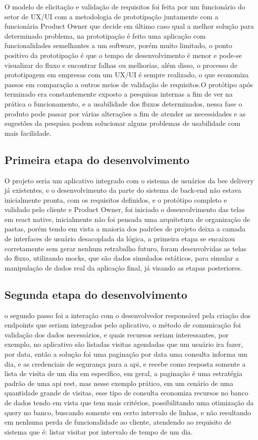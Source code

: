 \documentclass{ufersa}
\begin{document}
O modelo de elicitação e validação de requisitos foi feita por um funcionário do setor de UX/UI com a metodologia de prototipação juntamente com a funcionária Product Owner que decide em último caso qual a melhor solução para determinado problema, na prototipação é feito uma aplicação com funcionalidades semelhantes a um software, porém muito limitado, o ponto positivo da prototipação é que o tempo de desenvolvimento é menor e pode-se visualizar do fluxo e encontrar falhas ou melhorias, além disso, o processo de prototipagem em empresas com um UX/UI é sempre realizado, o que economiza passos em comparação a outros meios de validação de requisitos.O protótipo após terminado era constantemente exposto a pesquisas internas a fim de ver na prática o funcionamento, e a usabilidade dos fluxos determinados, nessa fase o produto pode passar por várias alterações a fim de atender as necessidades e as sugestões da pesquisa podem solucionar alguns problemas de usabilidade com mais facilidade. 

\subsection{Primeira etapa do desenvolvimento}

O projeto seria um aplicativo integrado com o sistema de usuários da bee delivery já existentes, e o 
desenvolvimento da parte do sistema de back-end não estava inicialmente pronta, com os requisitos definidos, e o protótipo completo e validado pelo cliente e Product Owner, foi iniciado o desenvolvimento das telas em react native, inicialmente não foi pensada uma arquitetura de organização de pastas, porém tendo em vista a maioria dos padrões de projeto deixa a camada de interfaces de usuário desacoplada da lógica, a primeira etapa se encaixou corretamente sem gerar nenhum retrabalho futuro, foram desenvolvidas as telas do fluxo, utilizando mocks, que são dados simulados estáticos, para simular a manipulação de dados real da aplicação final, já visando as etapas posteriores.

\subsection{Segunda etapa do desenvolvimento}
o segundo passo foi a interação com o desenvolvedor responsável pela criação dos endpoints que seriam integrados pelo aplicativo, o método de comunicação foi validação dos dados necessários, e quais recursos seriam interessantes, por exemplo, no aplicativo são listadas visitas agendadas que um usuário ira fazer, por data, então a solução foi uma paginação por data uma consulta informa um dia, e as credenciais de segurança para a api, e recebe como resposta somente a lista de visita de um dia em específico, em geral, a paginação é uma estratégia padrão de uma api rest, mas nesse exemplo prático, em um cenário de uma quantidade grande de visitas, esse tipo de consulta economiza recursos no banco de dados tendo em vista que tem mais critérios, possibilitando uma otimização da query no banco, buscando somente em certo intervalo de linhas, e não resultando em nenhuma perda de funcionalidade ao cliente, atendendo ao requisito de sistema que é: listar visitar por intervalo de tempo de um dia.
\end{document}
